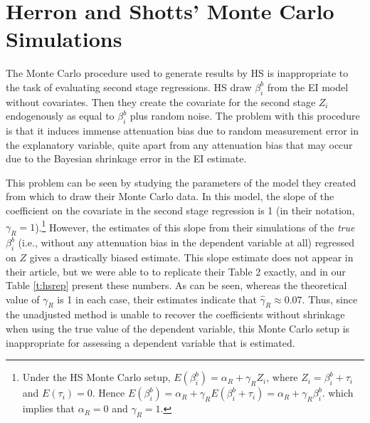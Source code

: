 \documentclass[11pt,titlepage]{article}
\begin{document}
\section{Herron and Shotts' Monte Carlo Simulations}

The Monte Carlo procedure used to generate results by HS is
inappropriate to the task of evaluating second stage regressions.  HS
draw $\beta_i^b$ from the EI model without covariates.  Then they
create the covariate for the second stage $Z_i$ endogenously as equal
to $\beta_i^b$ plus random noise.  The problem with this procedure is
that it induces immense attenuation bias due to random measurement
error in the explanatory variable, quite apart from any attenuation
bias that may occur due to the Bayesian shrinkage error in the EI
estimate.

This problem can be seen by studying the parameters of the model they
created from which to draw their Monte Carlo data.  In this model, the
slope of the coefficient on the covariate in the second stage
regression is 1 (in their notation, $\gamma_R=1$).\footnote{Under the
  HS Monte Carlo setup, $E(\beta_i^b)=\alpha_R+\gamma_R Z_i$, where
  $Z_i=\beta_i^b+\tau_i$ and $E(\tau_i)=0$.  Hence
  $E(\beta_i^b)=\alpha_R+\gamma_RE(\beta_i^b+\tau_i)=\alpha_R+\gamma_R\beta_i^b$.
  which implies that $\alpha_R=0$ and $\gamma_R=1$.}  However, the
estimates of this slope from their simulations of the \emph{true}
$\beta_i^b$ (i.e., without any attenuation bias in the dependent
variable at all) regressed on $Z$ gives a drastically biased estimate.
This slope estimate does not appear in their article, but we were able
to to replicate their Table 2 exactly, and in our Table \ref{t:hsrep}
present these numbers.  As can be seen, whereas the theoretical value
of $\gamma_R$ is 1 in each case, their estimates indicate that
$\hat\gamma_R\approx 0.07$.  Thus, since the unadjusted method is
unable to recover the coefficients without shrinkage when using the
true value of the dependent variable, this Monte Carlo setup is
inappropriate for assessing a dependent variable that is estimated.
\end{document}
